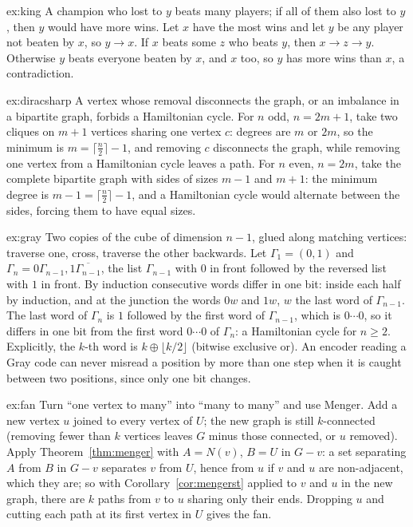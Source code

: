 \begin{solution}{ex:king}
\idea A champion who lost to $y$ beats many players; if all of them also lost to $y$, then $y$ would have more wins.
\writeup Let $x$ have the most wins and let $y$ be any player not beaten by $x$, so $y\to x$. If $x$ beats some $z$ who beats $y$, then $x\to z\to y$. Otherwise $y$ beats
everyone beaten by $x$, and $x$ too, so $y$ has more wins than $x$, a contradiction.
\end{solution}

\begin{solution}{ex:diracsharp}
\idea A vertex whose removal disconnects the graph, or an imbalance in a bipartite graph, forbids a Hamiltonian cycle.
\writeup For $n$ odd, $n=2m+1$, take two cliques on $m+1$ vertices sharing one vertex $c$: degrees are $m$ or $2m$, so the minimum is $m=\lceil\frac n2\rceil-1$,
and removing $c$ disconnects the graph, while removing one vertex from a Hamiltonian cycle leaves a path. For $n$ even, $n=2m$, take
the complete bipartite graph with sides of sizes $m-1$ and $m+1$: the minimum degree is $m-1=\lceil\frac n2\rceil-1$, and a Hamiltonian cycle would
alternate between the sides, forcing them to have equal sizes.
\end{solution}

\begin{solution}{ex:gray}
\idea Two copies of the cube of dimension $n-1$, glued along matching vertices: traverse one, cross, traverse the other backwards.
\writeup Let $\Gamma_1=(0,1)$ and $\Gamma_n=0\Gamma_{n-1},1\overline{\Gamma_{n-1}}$, the list $\Gamma_{n-1}$ with $0$ in front followed by the reversed list with $1$ in front. By
induction consecutive words differ in one bit: inside each half by induction, and at the junction the words $0w$ and $1w$, $w$ the last
word of $\Gamma_{n-1}$. The last word of $\Gamma_n$ is $1$ followed by the first word of $\Gamma_{n-1}$, which is $0\cdots0$, so it differs in one bit from the first word $0\cdots0$
of $\Gamma_n$: a Hamiltonian cycle for $n\ge2$. Explicitly, the $k$-th word is $k\oplus\lfloor k/2\rfloor$ (bitwise exclusive or). An encoder reading a Gray code can
never misread a position by more than one step when it is caught between two positions, since only one bit changes.
\end{solution}

\begin{solution}{ex:fan}
\idea Turn ``one vertex to many'' into ``many to many'' and use Menger.
\writeup Add a new vertex $u$ joined to every vertex of $U$; the new graph is still $k$-connected (removing fewer than $k$ vertices leaves $G$ minus those
connected, or $u$ removed). Apply Theorem~\ref{thm:menger} with $A=N(v)$, $B=U$ in $G-v$: a set separating $A$ from $B$ in $G-v$ separates $v$ from $U$, hence from $u$ if
$v$ and $u$ are non-adjacent, which they are; so with Corollary~\ref{cor:mengerst} applied to $v$ and $u$ in the new graph, there are $k$ paths from $v$ to $u$
sharing only their ends. Dropping $u$ and cutting each path at its first vertex in $U$ gives the fan.
\end{solution}

